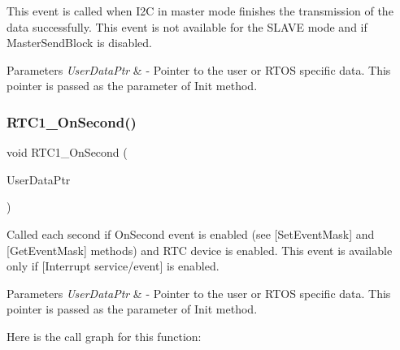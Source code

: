 This event is called when I2C in master mode finishes the transmission of the data successfully. This event is not available for the S\+L\+A\+VE mode and if Master\+Send\+Block is disabled. 


\begin{DoxyParams}{Parameters}
{\em User\+Data\+Ptr} & -\/ Pointer to the user or R\+T\+OS specific data. This pointer is passed as the parameter of Init method. \\
\hline
\end{DoxyParams}
\mbox{\label{group___events__module_ga2f94110e651cb30cba928647e91e92d4}} 
\subsubsection{\texorpdfstring{R\+T\+C1\+\_\+\+On\+Second()}{RTC1\_OnSecond()}}
{\footnotesize\ttfamily void R\+T\+C1\+\_\+\+On\+Second (\begin{DoxyParamCaption}\item[{\hyperlink{group___p_e___types__module_ga0b66a73f87238a782318aa0be7578e35}{L\+D\+D\+\_\+\+T\+User\+Data} $\ast$}]{User\+Data\+Ptr }\end{DoxyParamCaption})}



Called each second if On\+Second event is enabled (see \mbox{[}Set\+Event\+Mask\mbox{]} and \mbox{[}Get\+Event\+Mask\mbox{]} methods) and R\+TC device is enabled. This event is available only if \mbox{[}Interrupt service/event\mbox{]} is enabled. 


\begin{DoxyParams}{Parameters}
{\em User\+Data\+Ptr} & -\/ Pointer to the user or R\+T\+OS specific data. This pointer is passed as the parameter of Init method. \\
\hline
\end{DoxyParams}
Here is the call graph for this function\+:
\mbox{\label{group___events__module_ga01b566cf25a21b34152513dcb1321a11}} 
